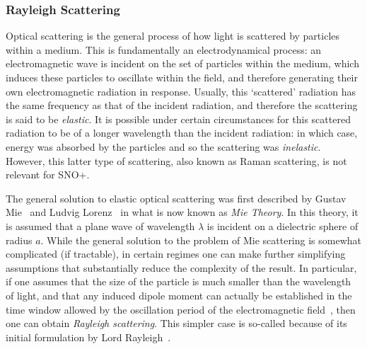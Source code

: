  \subsubsection{Rayleigh Scattering}
Optical scattering is the general process of how light is scattered by particles within a medium. This is fundamentally an electrodynamical process: an electromagnetic wave is incident on the set of particles within the medium, which induces these particles to oscillate within the field, and therefore generating their own electromagnetic radiation in response. Usually, this `scattered' radiation has the same frequency as that of the incident radiation, and therefore the scattering is said to be \textit{elastic}. It is possible under certain circumstances for this scattered radiation to be of a longer wavelength than the incident radiation: in which case, energy was absorbed by the particles and so the scattering was \textit{inelastic}. However, this latter type of scattering, also known as Raman scattering, is not relevant for SNO+.

The general solution to elastic optical scattering was first described by Gustav Mie~\cite{mieContributionsOpticsTurbid1908} %
and Ludvig Lorenz~\cite{lorenzLumiereReflechieRefractee1898} %
in what is now known as \textit{Mie Theory}. In this theory, it is assumed that a plane wave of wavelength $\lambda$ is incident on a dielectric sphere of radius $a$. While the general solution to the problem of Mie scattering is somewhat complicated (if tractable), in certain regimes one can make further simplifying assumptions that substantially reduce the complexity of the result. In particular, if one assumes that the size of the particle is much smaller than the wavelength of light, and that any induced dipole moment can actually be established in the time window allowed by the oscillation period of the electromagnetic field~\cite{HulstH.C.vande1981Lsbs}, %
then one can obtain \textit{Rayleigh scattering}. This simpler case is so-called because of its initial formulation by Lord Rayleigh~\cite{rayleighTransmissionLightAtmosphere1899}. %

